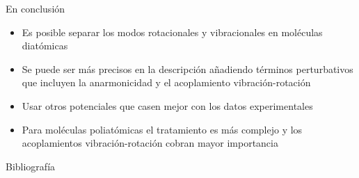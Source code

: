 \documentclass[a4paper]{beamer}
\begin{document}
\begin{frame}{En conclusión}
\begin{itemize}
\item Es posible separar los modos rotacionales y vibracionales en moléculas diatómicas
\item Se puede ser más precisos en la descripción añadiendo términos perturbativos que incluyen la anarmonicidad y el acoplamiento vibración-rotación
\item Usar otros potenciales que casen mejor con los datos experimentales
\item Para moléculas poliatómicas el tratamiento es más complejo y los acoplamientos vibración-rotación cobran mayor importancia 
\end{itemize}

\end{frame}

\begin{frame}{Bibliografía}
\printbibliography
\end{frame}
\end{document}
